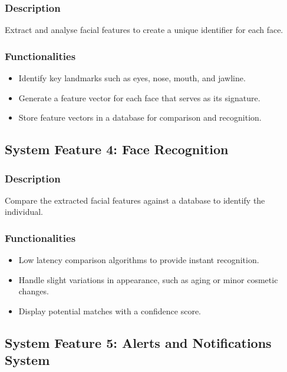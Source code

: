            \subsubsection{Description}
            Extract and analyse facial features to create a unique identifier for each face.
            \subsubsection{Functionalities}
                \begin{itemize}
                    \item Identify key landmarks such as eyes, nose, mouth, and jawline.
                    \item Generate a feature vector for each face that serves as its signature.
                    \item Store feature vectors in a database for comparison and recognition.                
                \end{itemize}
        
                \subsection{System Feature 4: Face Recognition}   
                \subsubsection{Description}
                Compare the extracted facial features against a database to identify the individual.
                \subsubsection{Functionalities}
                    \begin{itemize}
                        \item Low latency comparison algorithms to provide instant recognition.
                        \item Handle slight variations in appearance, such as aging or minor cosmetic changes.
                        \item Display potential matches with a confidence score.
                                    
                    \end{itemize}
    
                    \subsection{System Feature 5: Alerts and Notifications System}   

